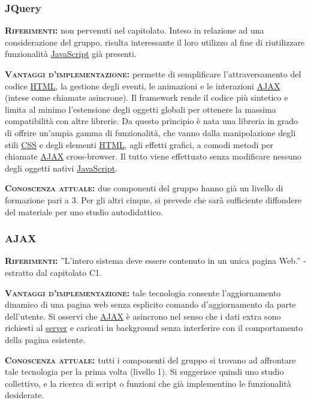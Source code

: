 \subsubsection{JQuery}
\begin{description}
	\item{\scshape\bfseries Riferimenti:} non pervenuti nel capitolato. Inteso in relazione ad una considerazione del gruppo, risulta interessante il loro utilizzo al fine di riutilizzare funzionalità \underline{JavaScript} già presenti.
	
	\item{\scshape\bfseries Vantaggi d'implementazione:} permette di semplificare l'attraversamento del codice \underline{HTML}, la gestione degli eventi, le animazioni e le interazioni \underline{AJAX} (intese come chiamate asincrone). Il framework rende il codice più sintetico e limita al minimo l’estensione degli oggetti globali per ottenere la massima compatibilità con altre librerie. Da questo principio è nata una libreria in grado di offrire un'ampia gamma di funzionalità, che vanno dalla manipolazione degli stili \underline{CSS} e degli elementi \underline{HTML}, agli effetti grafici, a comodi metodi per chiamate \underline{AJAX} cross-browser. Il tutto viene effettuato senza modificare nessuno degli oggetti nativi \underline{JavaScript}.
	
	\item{\scshape\bfseries Conoscenza attuale:} due componenti del gruppo hanno già un livello di formazione pari a 3. Per gli altri cinque, si prevede che sarà sufficiente diffondere del materiale per uno studio autodidattico.
\end{description}

\subsubsection{AJAX}
\begin{description}
	\item{\scshape\bfseries Riferimenti:} ''L'intero sistema deve essere contenuto in un unica pagina Web.'' - estratto dal capitolato C1.

	\item{\scshape\bfseries Vantaggi d'implementazione:} tale tecnologia consente l'aggiornamento dinamico di una pagina web senza esplicito comando d'aggiornamento da parte dell'utente. Si osservi che \underline{AJAX} è asincrono nel senso che i dati extra sono richiesti al \underline{server} e caricati in background senza interferire con il comportamento della pagina esistente.
	
	\item{\scshape\bfseries Conoscenza attuale:} tutti i componenti del gruppo si trovano ad affrontare tale tecnologia per la prima volta (livello 1). Si suggerisce quindi uno studio collettivo, e la ricerca di script o funzioni che già implementino le funzionalità desiderate.
\end{description}

